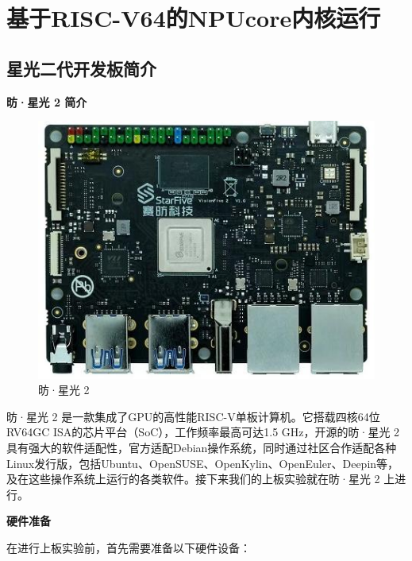 \section{基于RISC-V64的NPUcore内核运行}
\subsection{星光二代开发板简介}
\textbf{昉·星光 2 简介}

\begin{figure}[ht]
	\centering
	\includegraphics[width=0.5\linewidth]{figures/08-02-昉·星光 2.jpg}
	\caption{昉·星光 2}
\end{figure}

昉·星光 2 是一款集成了GPU的高性能RISC-V单板计算机。它搭载四核64位RV64GC ISA的芯片平台（SoC），工作频率最高可达1.5 GHz，开源的昉·星光 2具有强大的软件适配性，官方适配Debian操作系统，同时通过社区合作适配各种Linux发行版，包括Ubuntu、OpenSUSE、OpenKylin、OpenEuler、Deepin等，及在这些操作系统上运行的各类软件。接下来我们的上板实验就在昉·星光 2 上进行。

\textbf{硬件准备}

在进行上板实验前，首先需要准备以下硬件设备：

